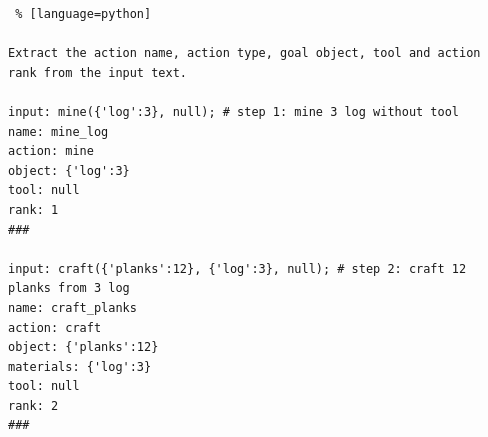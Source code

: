 
\begin{lstlisting} % [language=python] 

Extract the action name, action type, goal object, tool and action rank from the input text.

input: mine({'log':3}, null); # step 1: mine 3 log without tool
name: mine_log
action: mine
object: {'log':3}
tool: null
rank: 1
###

input: craft({'planks':12}, {'log':3}, null); # step 2: craft 12 planks from 3 log
name: craft_planks
action: craft
object: {'planks':12}
materials: {'log':3}
tool: null
rank: 2
###




\end{lstlisting}


